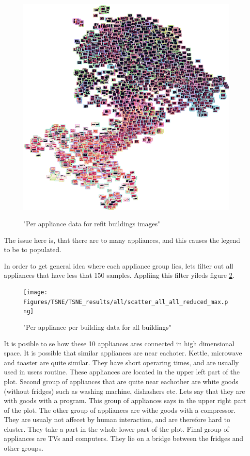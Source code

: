 \begin{figure}[H]
	\centering
	\caption{"Per appliance data for refit buildings images"}
	\includegraphics[width=.9\textwidth]{Figures/TSNE/TSNE_results/all/img_scatter_allall_lgimgs.png}
	\label{fig:tsne_papb_img_scatter_all}
\end{figure}

The issue here is, that there are to many appliances, and this
causes the legend to be to populated.


In order to get general idea where each appliance group lies,
lets filter out all appliances that have less that 150 samples.
Appliing this filter yileds figure \ref{fig:tsne_papb_scatter_all_reduced}.

\begin{figure}[H]
	\centering
	\caption{"Per appliance per building data for all buildings"}
	\texttt{[image: Figures/TSNE/TSNE\_results/all/scatter\_all\_all\_reduced\_max.png]}
	\label{fig:tsne_papb_scatter_all_reduced}
\end{figure}

It is posible to se how these 10 appliances ares connected in high dimensional space.
It is possible that similar appliances are near eachoter.
Kettle, microwave and toaster are quite similar.
They have short operaring times, and are usually used in users routine.
These appliances are located in the upper left part of the plot.
Second group of appliances that are quite near eachother are white
goods (without fridges) such as washing machine, dishashers etc.
Lets say that they are with goods with a program. 
This group of appliances says in the upper right part of the plot.
The other group of appliances are withe goods with a compressor.
They are usualy not affecet by human interaction, and are 
therefore hard to cluster. They take a part in the whole lower part of the plot.
Final group of appliances are TVs and computers. They lie 
on a bridge between the fridges and other groups. 

